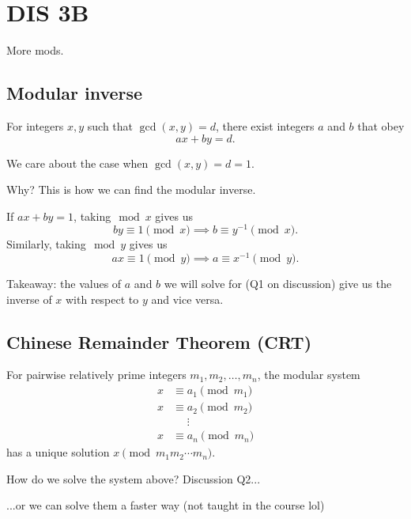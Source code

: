 \section{DIS 3B}

More mods. 

\subsection{Modular inverse}
\begin{lemma}[Bézout]
    For integers $x,y$ such that $\gcd(x,y) = d$, there exist integers $a$ and $b$ that obey \[ ax + by = d. \]
\end{lemma}

We care about the case when $\gcd(x,y) = d = 1$. 

Why? This is how we can find the modular inverse. 

\vspace{3mm}

If $ax + by = 1$, taking$\mod x$ gives us \[ by \equiv 1 \pmod{x} \implies b \equiv y^{-1} \pmod{x}. \] Similarly, taking$\mod y$ gives us \[ ax \equiv 1 \pmod{y} \implies a \equiv x^{-1} \pmod{y}. \]

Takeaway: the values of $a$ and $b$ we will solve for (Q1 on discussion) give us the inverse of $x$ with respect to $y$ and vice versa. 

\subsection{Chinese Remainder Theorem (CRT)}

\begin{theorem}[CRT]
    For pairwise relatively prime integers $m_1, m_2, \ldots, m_n$, the modular system \begin{align*}
        x &\equiv a_1 \pmod{m_1} \\
        x &\equiv a_2 \pmod{m_2} \\
        &\phantom{=}\vdots \\
        x &\equiv a_n \pmod{m_n} 
    \end{align*} has a unique solution $x \pmod{m_1m_2\cdots m_n}$. 
\end{theorem}

How do we solve the system above? Discussion Q2...

...or we can solve them a faster way (not taught in the course lol)

